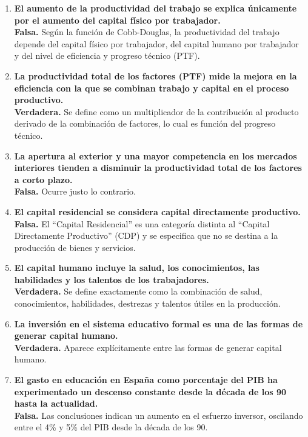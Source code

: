 \begin{enumerate}[label=\arabic*., resume=preguntas]

    \item \textbf{El aumento de la productividad del trabajo se explica únicamente por el aumento del capital físico por trabajador.} \\
    \textbf{Falsa.} Según la función de Cobb-Douglas, la productividad del trabajo depende del capital físico por trabajador, del capital humano por trabajador y del nivel de eficiencia y progreso técnico (PTF).

    \item \textbf{La productividad total de los factores (PTF) mide la mejora en la eficiencia con la que se combinan trabajo y capital en el proceso productivo.} \\
    \textbf{Verdadera.} Se define como un multiplicador de la contribución al producto derivado de la combinación de factores, lo cual es función del progreso técnico.

    \item \textbf{La apertura al exterior y una mayor competencia en los mercados interiores tienden a disminuir la productividad total de los factores a corto plazo.} \\
    \textbf{Falsa.} Ocurre justo lo contrario.

    \item \textbf{El capital residencial se considera capital directamente productivo.} \\
    \textbf{Falsa.} El ``Capital Residencial'' es una categoría distinta al ``Capital Directamente Productivo'' (CDP) y se especifica que no se destina a la producción de bienes y servicios.

    \item \textbf{El capital humano incluye la salud, los conocimientos, las habilidades y los talentos de los trabajadores.} \\
    \textbf{Verdadera.} Se define exactamente como la combinación de salud, conocimientos, habilidades, destrezas y talentos útiles en la producción.

    \item \textbf{La inversión en el sistema educativo formal es una de las formas de generar capital humano.} \\
    \textbf{Verdadera.} Aparece explícitamente entre las formas de generar capital humano.

    \item \textbf{El gasto en educación en España como porcentaje del PIB ha experimentado un descenso constante desde la década de los 90 hasta la actualidad.} \\
    \textbf{Falsa.} Las conclusiones indican un aumento en el esfuerzo inversor, oscilando entre el 4\% y 5\% del PIB desde la década de los 90.


\end{enumerate}
